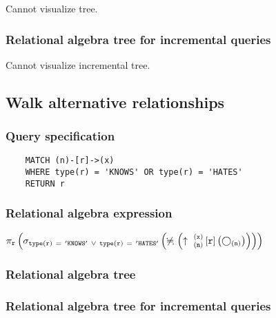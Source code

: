 	Cannot visualize tree.

	\subsubsection*{Relational algebra tree for incremental queries}

	Cannot visualize incremental tree.
	\subsection{Walk alternative relationships}

	\subsubsection*{Query specification}

	\begin{lstlisting}
	MATCH (n)-[r]->(x)
	WHERE type(r) = 'KNOWS' OR type(r) = 'HATES'
	RETURN r
	\end{lstlisting}


	\subsubsection*{Relational algebra expression}

	$\projection{\var{r}} \left(\selection{\mathtt{type(r)~=~'KNOWS'~\lor~type(r)~=~'HATES'}} \left(\alldifferent{} \left(\expandout{n}{x}{}{r}{} \left(\getvertices{n}{}\right)\right)\right)\right)$

	\subsubsection*{Relational algebra tree}


	\subsubsection*{Relational algebra tree for incremental queries}

